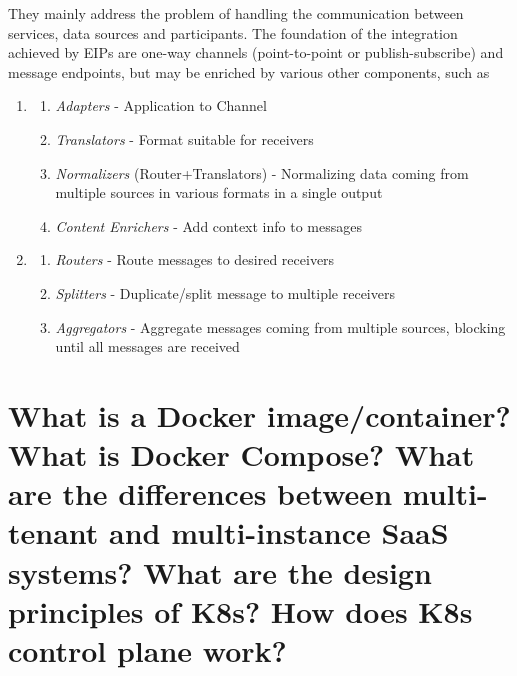 They mainly address the problem of handling the communication between services, data sources and participants.
The foundation of the integration achieved by EIPs are one-way channels (point-to-point or publish-subscribe) and message endpoints, but may be enriched by various other components, such as
\begin{enumerate}[parsep=0em,noitemsep,topsep=0em]
   \item \begin{enumerate}
      \item \textit{Adapters} - Application to Channel
      \item \textit{Translators} - Format suitable for receivers
      \item \textit{Normalizers} (Router+Translators) - Normalizing data coming from multiple sources in various formats in a single output 
      \item \textit{Content Enrichers} - Add context info to messages
   \end{enumerate}
   \item 
   \begin{enumerate}
      \item \textit{Routers} - Route messages to desired receivers
      \item \textit{Splitters} - Duplicate/split message to multiple receivers
      \item \textit{Aggregators} - Aggregate messages coming from multiple sources, blocking until all messages are received
   \end{enumerate}
\end{enumerate}

\section{What is a Docker image/container? What is Docker Compose? What are the differences between multi-tenant and multi-instance SaaS systems? What are the design principles of K8s? How does K8s control plane work?}

